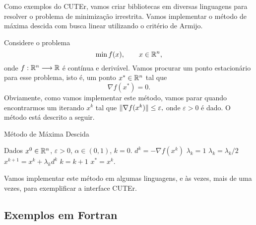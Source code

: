 \documentclass[letterpaper,11pt]{article}
\numberwithin{equation}{section}
\begin{document}
Como exemplos do CUTEr, vamos criar bibliotecas em diversas linguagens para resolver o 
problema de minimização irrestrita. 
Vamos implementar o método de máxima descida com busca linear utilizando o
critério de Armijo.

Considere o problema
\begin{equation}
 \min f(x), \qquad x \in \mathbb{R}^{n},
\end{equation}
onde $f:\mathbb{R}^{n}\longrightarrow\mathbb{R}$ é contínua e derivável. Vamos procurar um ponto estacionário para esse
problema, isto é, um ponto $x^* \in \mathbb{R}^{n}$ tal que $$\nabla f(x^*) = 0.$$
Obviamente, como vamos implementar este método, vamos parar quando encontrarmos um
iterando $x^k$ tal que $\Vert \nabla f(x^k)\Vert \leq \varepsilon,$ onde $\varepsilon > 0$ é
dado. O método está descrito a seguir.
\begin{algorithm}[H]
\caption{Método de Máxima Descida}
 \begin{algorithmic}[1]
 \State Dados $x^0 \in \mathbb{R}^{n}$, $\varepsilon > 0$, $\alpha \in (0,1)$, $k = 0$.
  \State $d^k = -\nabla f(x^k)$
  \State $\lambda_k = 1$
   \State $\lambda_k = \lambda_k/2$
  \EndWhile
  \State $x^{k+1} = x^k + \lambda_kd^k$
  \State $k = k + 1$
 \EndWhile
 \State $x^* = x^k$.
 \end{algorithmic}
\end{algorithm}
Vamos implementar este método em algumas linguagens, e às vezes, mais de uma vezes, para
exemplificar a interface CUTEr.

\subsection{Exemplos em Fortran}
\end{document}
